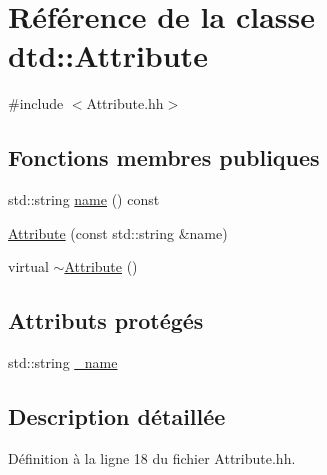 \hypertarget{classdtd_1_1_attribute}{
\section{Référence de la classe dtd::Attribute}
\label{classdtd_1_1_attribute}
}


{\ttfamily \#include $<$Attribute.hh$>$}

\subsection*{Fonctions membres publiques}
\begin{DoxyCompactItemize}
\item 
std::string \hyperlink{classdtd_1_1_attribute_a3d1e42a5210df12eaccdb2b2d6ce6147}{name} () const 
\item 
\hyperlink{classdtd_1_1_attribute_a776a0717a54d9d071704f69118797f84}{Attribute} (const std::string \&name)
\item 
virtual \hyperlink{classdtd_1_1_attribute_a5bcf54eef0c5573abb39469bd76c2dd3}{$\sim$Attribute} ()
\end{DoxyCompactItemize}
\subsection*{Attributs protégés}
\begin{DoxyCompactItemize}
\item 
std::string \hyperlink{classdtd_1_1_attribute_a1df987474cc5fb17dd4ce699e50443c8}{\_\-name}
\end{DoxyCompactItemize}


\subsection{Description détaillée}


Définition à la ligne 18 du fichier Attribute.hh.



